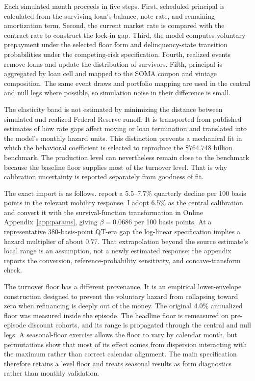 Each simulated month proceeds in five steps. First, scheduled principal is calculated from the surviving loan's balance, note rate, and remaining amortization term. Second, the current market rate is compared with the contract rate to construct the lock-in gap. Third, the model computes voluntary prepayment under the selected floor form and delinquency-state transition probabilities under the competing-risk specification. Fourth, realized events remove loans and update the distribution of survivors. Fifth, principal is aggregated by loan cell and mapped to the SOMA coupon and vintage composition. The same event draws and portfolio mapping are used in the central and null legs where possible, so simulation noise in their difference is small.

The elasticity band is not estimated by minimizing the distance between simulated and realized Federal Reserve runoff. It is transported from published estimates of how rate gaps affect moving or loan termination and translated into the model's monthly hazard units. This distinction prevents a mechanical fit in which the behavioral coefficient is selected to reproduce the \$764.748 billion benchmark. The production level can nevertheless remain close to the benchmark because the baseline floor supplies most of the turnover level. That is why calibration uncertainty is reported separately from goodness of fit.

The exact import is as follows. \citet{liebersohn2024} report a 5.5--7.7\% quarterly decline per 100 basis points in the relevant mobility response. I adopt 6.5\% as the central calibration and convert it with the survival-function transformation in Online Appendix~\ref{app:params}, giving $\beta=0.0686$ per 100 basis points. At a representative 380-basis-point QT-era gap the log-linear specification implies a hazard multiplier of about $0.77$. That extrapolation beyond the source estimate's local range is an assumption, not a newly estimated response; the appendix reports the conversion, reference-probability sensitivity, and concave-transform check.

The turnover floor has a different provenance. It is an empirical lower-envelope construction designed to prevent the voluntary hazard from collapsing toward zero when refinancing is deeply out of the money. The original 4.0\% annualized floor was measured inside the episode. The headline floor is remeasured on pre-episode discount cohorts, and its range is propagated through the central and null legs. A seasonal-floor exercise allows the floor to vary by calendar month, but permutations show that most of its effect comes from dispersion interacting with the maximum rather than correct calendar alignment. The main specification therefore retains a level floor and treats seasonal results as form diagnostics rather than monthly validation.

